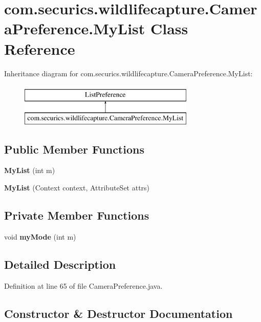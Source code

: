 \section{com.\+securics.\+wildlifecapture.\+Camera\+Preference.\+My\+List Class Reference}
\label{classcom_1_1securics_1_1wildlifecapture_1_1_camera_preference_1_1_my_list}
Inheritance diagram for com.\+securics.\+wildlifecapture.\+Camera\+Preference.\+My\+List\+:\begin{figure}[H]
\begin{center}
\leavevmode
\includegraphics[height=2.000000cm]{classcom_1_1securics_1_1wildlifecapture_1_1_camera_preference_1_1_my_list}
\end{center}
\end{figure}
\subsection*{Public Member Functions}
\begin{DoxyCompactItemize}
\item 
{\bf My\+List} (int m)
\item 
{\bf My\+List} (Context context, Attribute\+Set attrs)
\end{DoxyCompactItemize}
\subsection*{Private Member Functions}
\begin{DoxyCompactItemize}
\item 
void {\bf my\+Mode} (int m)
\end{DoxyCompactItemize}


\subsection{Detailed Description}


Definition at line 65 of file Camera\+Preference.\+java.



\subsection{Constructor \& Destructor Documentation}
